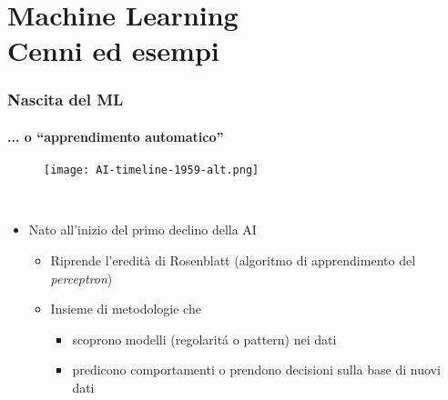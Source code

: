 \section{Machine Learning\\{\small Cenni ed esempi}} %
\label{sec:ml_intro}
%
\begin{frame}[t] \frametitle{Nascita del ML}
{\scriptsize
{}
\framesubtitle{... o ``apprendimento automatico''}
\vspace*{-.5cm}
    \begin{minipage}[t]{\textwidth}
        \begin{figure}[ht]
            \centering
            \texttt{[image: AI-timeline-1959-alt.png]}
        \end{figure}
    \end{minipage}
    \\\vspace*{.3cm}
    \begin{minipage}[t]{\textwidth}
        \begin{minipage}[t]{0.6\textwidth}
            \begin{itemize}[leftmargin=10pt,align=right]
                \item[\alert{\faArrowCircleRight}] Nato all'inizio del primo declino della AI
                \begin{itemize}[leftmargin=10pt,align=right]
                                \item[\alert{\faArrowCircleRight}] Riprende l'eredità di Rosenblatt (algoritmo di apprendimento del \emph{perceptron})
                                \item[\alert{\faArrowCircleRight}] Insieme di metodologie che
                                \begin{itemize}[leftmargin=10pt,align=right]
                                    \item[\alert{\faArrowCircleRight}] scoprono \alert{modelli} (regolarit\'{a} o \alert{pattern}) nei dati
                                    \item[\alert{\faArrowCircleRight}] predicono comportamenti o prendono decisioni sulla base di nuovi dati
                                \end{itemize}
                \end{itemize}
            \end{itemize}
            \begin{minipage}[t]{\textwidth}

\end{minipage}
\end{minipage}
\end{minipage}}
\end{frame}
